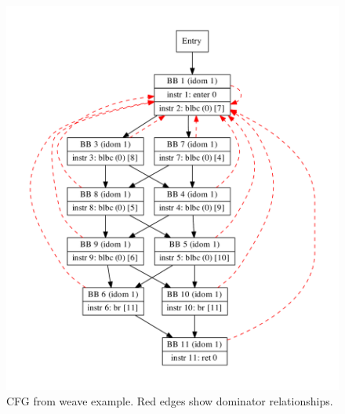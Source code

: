 \documentclass[10pt,twocolumn]{article}
\begin{document}
\begin{figure}
\begin{center}
  \includegraphics[width=0.95\columnwidth]{figs/weave.pdf}
\begin{minipage}{0.95\columnwidth}
  \caption{\label{fig:weave} CFG from weave example. Red edges show dominator relationships.}
\end{minipage}
\end{center}
\end{figure}
\end{document}
